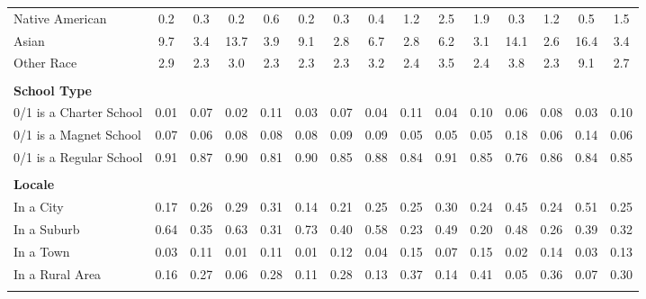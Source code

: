 \begin{tabular*}{\linewidth}{@{\extracolsep{\fill} } lcccccccccccccc}
\hspace{0.2cm}Native American&0.2&0.3&0.2&0.6&0.2&0.3&0.4&1.2&2.5&1.9&0.3&1.2&0.5&1.5\\%
\hspace{0.2cm}Asian&9.7&3.4&13.7&3.9&9.1&2.8&6.7&2.8&6.2&3.1&14.1&2.6&16.4&3.4\\%
\hspace{0.2cm}Other Race&2.9&2.3&3.0&2.3&2.3&2.3&3.2&2.4&3.5&2.4&3.8&2.3&9.1&2.7\\%
&&&&&&&&&&&&&&\\%
\multicolumn{15}{l}{\bfseries School Type}\\%
\hspace{0.2cm}0/1 is a Charter School&0.01&0.07&0.02&0.11&0.03&0.07&0.04&0.11&0.04&0.10&0.06&0.08&0.03&0.10\\%
\hspace{0.2cm}0/1 is a Magnet School&0.07&0.06&0.08&0.08&0.08&0.09&0.09&0.05&0.05&0.05&0.18&0.06&0.14&0.06\\%
\hspace{0.2cm}0/1 is a Regular School&0.91&0.87&0.90&0.81&0.90&0.85&0.88&0.84&0.91&0.85&0.76&0.86&0.84&0.85\\%
&&&&&&&&&&&&&&\\%
\multicolumn{15}{l}{\bfseries Locale}\\%
\hspace{0.2cm}In a City&0.17&0.26&0.29&0.31&0.14&0.21&0.25&0.25&0.30&0.24&0.45&0.24&0.51&0.25\\%
\hspace{0.2cm}In a Suburb&0.64&0.35&0.63&0.31&0.73&0.40&0.58&0.23&0.49&0.20&0.48&0.26&0.39&0.32\\%
\hspace{0.2cm}In a Town&0.03&0.11&0.01&0.11&0.01&0.12&0.04&0.15&0.07&0.15&0.02&0.14&0.03&0.13\\%
\hspace{0.2cm}In a Rural Area&0.16&0.27&0.06&0.28&0.11&0.28&0.13&0.37&0.14&0.41&0.05&0.36&0.07&0.30\\%
&&&&&&&&&&&&&&\\%
\hline%
\end{tabular*}